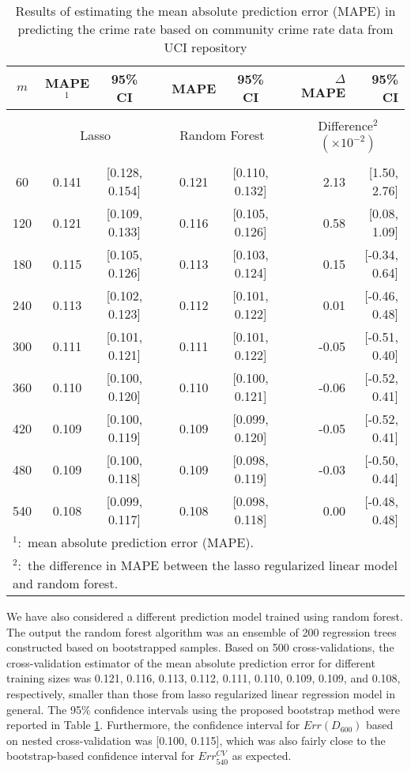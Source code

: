 \documentclass[12pt]{article}
\begin{document}
\begin{table}[ht]{
\centering
\setlength{\tabcolsep}{3pt}
\renewcommand{\arraystretch}{0.5}
\begin{tabular}{ ccc c cc c rr}
$m$   &  MAPE$^1$     &  95\% CI    && MAPE & 95\% CI &&  $\Delta$ MAPE & 95\% CI \\
\hline\\
    & \multicolumn{2}{c}{Lasso} && \multicolumn{2}{c}{Random Forest} && \multicolumn{2}{c}{Difference$^2$ $(\times 10^{-2})$}\\
    \cline{2-3} \cline{5-6} \cline{8-9}\\
60  &  0.141  & [0.128, 0.154] && 0.121 & [0.110, 0.132] && 2.13  & [1.50, 2.76]\\
120 &  0.121  & [0.109, 0.133] && 0.116 & [0.105, 0.126] && 0.58  & [0.08, 1.09]\\
180 &  0.115  & [0.105, 0.126] && 0.113 & [0.103, 0.124] && 0.15  & [-0.34, 0.64]\\
240 &  0.113  & [0.102, 0.123] && 0.112 & [0.101, 0.122] && 0.01  & [-0.46, 0.48]\\
300 &  0.111  & [0.101, 0.121] && 0.111 & [0.101, 0.122] && -0.05 & [-0.51, 0.40]\\
360 &  0.110  & [0.100, 0.120] && 0.110 & [0.100, 0.121] && -0.06 & [-0.52, 0.41]\\
420 &  0.109  & [0.100, 0.119] && 0.109 & [0.099, 0.120] && -0.05 & [-0.52, 0.41]\\
480 &  0.109  & [0.100, 0.118] && 0.109 & [0.098, 0.119] && -0.03 & [-0.50, 0.44]\\
540 &  0.108  & [0.099, 0.117] && 0.108 & [0.098, 0.118] &&  0.00 & [-0.48, 0.48]\\
\hline
\multicolumn{9}{l}{$^1:$ mean absolute prediction error (MAPE). }\\
\multicolumn{9}{l}{$^2:$ the difference in MAPE between the lasso regularized linear model and random forest. }
\end{tabular} 
\caption{Results of estimating the mean absolute prediction error (MAPE) in predicting the crime rate based on community crime rate data from UCI repository}\label{tab:example1}}
\end{table} 

We have also considered a different prediction model trained using random forest.   The output the random forest algorithm was an ensemble of 200 regression trees constructed based on bootstrapped samples. Based on 500 cross-validations, the cross-validation estimator of the mean absolute prediction error for different training sizes was 0.121, 0.116, 0.113, 0.112, 0.111, 0.110, 0.109, 0.109, and 0.108, respectively, smaller than those from lasso regularized linear regression model in general. The 95\% confidence intervals using the proposed bootstrap method were reported in Table \ref{tab:example1}.  Furthermore, the confidence interval for $Err(D_{600})$ based on nested cross-validation was [0.100, 0.115], which was also fairly close to the bootstrap-based confidence interval for $Err_{540}^{CV}$ as expected.  
\end{document}
